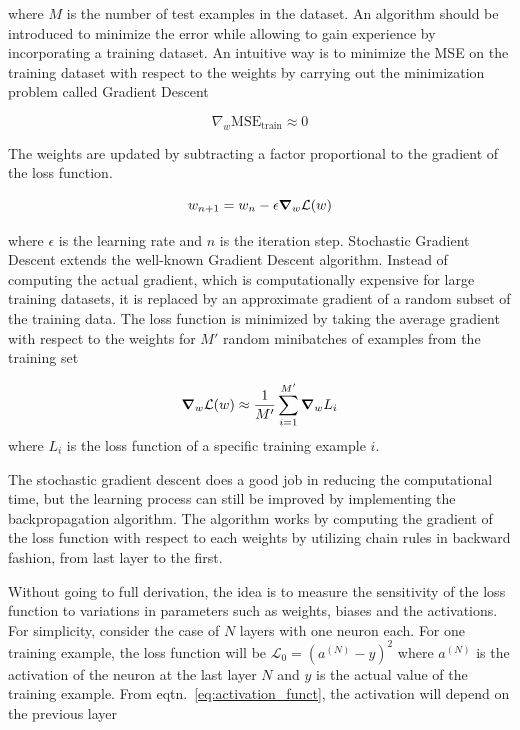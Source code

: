 where $M$ is the number of test examples in the dataset. An algorithm should be
introduced to minimize the error  while allowing to gain
experience by incorporating a training dataset.
An intuitive way is to minimize the MSE on the training dataset with respect to
the weights by carrying out
the minimization problem called Gradient Descent

\begin{equation}
    \nabla_w \text{MSE}_\text{train} \approx 0
\end{equation}

The weights are updated by subtracting a factor proportional to the
gradient of the loss function.

\begin{equation}
    w_{n+1} = w_n - \epsilon  \grad_w \mathcal{L}(w)
\end{equation}

where $\epsilon$ is the learning rate and $n$ is the iteration step. Stochastic
Gradient Descent extends the well-known Gradient Descent algorithm. Instead of
computing the
actual gradient, which is computationally expensive for large training
datasets,  it is replaced
by an approximate gradient of a random subset of the training data. The loss
function is minimized by taking  the average gradient with respect to the
weights for $M'$ random minibatches of examples from the training set

\begin{align}
    \grad_w \mathcal{L}(w) \approx \frac{1}{M'} \sum_{i=1}^{M'} \grad_w L_i
\end{align}
where $L_i$ is the loss function of a specific training example $i$.

The stochastic gradient descent does a good job in reducing the computational
time, but the learning process can still be improved by implementing the
backpropagation algorithm. The algorithm works by computing the gradient of
the loss function with respect to each weights by utilizing chain rules in
backward fashion, from last layer to the first.

Without going to full derivation, the idea is to measure the sensitivity of the
loss function  to variations in  parameters such as weights,
biases and the activations.  For simplicity, consider the case of $N$ layers
with one neuron each. For one training example,  the loss function will be
$\mathcal{L}_0 = \left(a^{(N)} - y \right)^2$ where $a^{(N)}$ is the activation
of the
neuron at the last layer $N$ and $y$ is the actual value of the training
example. From eqtn.~\eqref{eq:activation_funct}, the activation will depend on
the previous layer

